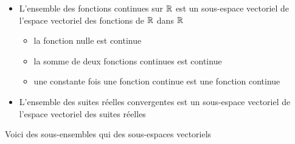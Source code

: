 \begin{frame}
\begin{exemple}
\begin{itemize}
  \item L'ensemble des fonctions continues sur $\mathbb{R}$ est un sous-espace vectoriel 
  de l'espace vectoriel des fonctions de $\mathbb{R}$ dans $\mathbb{R}$
  

  \pause
  
  \begin{itemize}
    \item la fonction nulle est continue
    \pause
    
    \item la somme de deux fonctions continues est continue
    \pause
    
    \item une constante fois une fonction continue est une fonction continue 
  \end{itemize}    

  \pause
  
  \item L'ensemble des suites réelles convergentes est un 
  sous-espace vectoriel de l'espace vectoriel des suites réelles
  
\end{itemize}
\end{exemple}
\end{frame}


\begin{frame}
Voici des sous-ensembles qui  des sous-espaces vectoriels

\pause
\begin{enumerate}


  
  
  
  
\end{enumerate}  

\end{frame}


